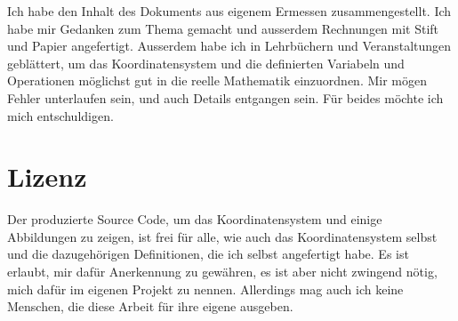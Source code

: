 \documentclass[a4paper]{article}
\begin{document}
\begin{example}
Ich habe den Inhalt des Dokuments aus eigenem Ermessen zusammengestellt. Ich habe mir Gedanken zum Thema gemacht und
ausserdem Rechnungen mit Stift und Papier angefertigt. Ausserdem habe ich in Lehrb\"uchern und Veranstaltungen gebl\"attert,
um das Koordinatensystem und die definierten Variabeln und Operationen m\"oglichst gut in die reelle Mathematik einzuordnen.
Mir m\"ogen Fehler unterlaufen sein, und auch Details entgangen sein. F\"ur beides m\"ochte ich mich entschuldigen.\\


\section{Lizenz}

Der produzierte Source Code, um das Koordinatensystem und einige Abbildungen zu zeigen, ist frei f\"ur alle,
wie auch das Koordinatensystem selbst und die dazugeh\"origen Definitionen, die ich selbst angefertigt habe.
Es ist erlaubt, mir daf\"ur Anerkennung zu gew\"ahren, es ist aber nicht zwingend n\"otig, mich daf\"ur im
eigenen Projekt zu nennen. Allerdings mag auch ich keine Menschen, die diese Arbeit f\"ur ihre eigene ausgeben.\\



\end{example}
\end{document}
